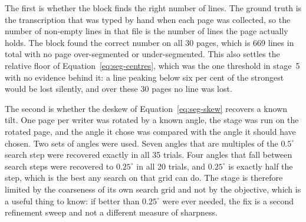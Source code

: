 The first is whether the block finds the right number of lines. The ground truth is the transcription that was typed by hand when each page was collected, so the number of non-empty lines in that file is the number of lines the page actually holds. The block found the correct number on all 30 pages, which is 669 lines in total with no page over-segmented or under-segmented. This also settles the relative floor of Equation~\ref{eq:seg-centres}, which was the one threshold in stage~5 with no evidence behind it: a line peaking below six per cent of the strongest would be lost silently, and over these 30 pages no line was lost.

The second is whether the deskew of Equation~\ref{eq:seg-skew} recovers a known tilt. One page per writer was rotated by a known angle, the stage was run on the rotated page, and the angle it chose was compared with the angle it should have chosen. Two sets of angles were used. Seven angles that are multiples of the $0.5^\circ$ search step were recovered exactly in all 35 trials. Four angles that fall between search steps were recovered to $0.25^\circ$ in all 20 trials, and $0.25^\circ$ is exactly half the step, which is the best any search on that grid can do. The stage is therefore limited by the coarseness of its own search grid and not by the objective, which is a useful thing to know: if better than $0.25^\circ$ were ever needed, the fix is a second refinement sweep and not a different measure of sharpness.

